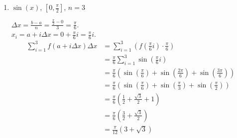 \documentclass[nooutcomes,handout]{ximera}
\begin{document}
\begin{problem}
\begin{enumerate}
	\item  $\sin (x)$, \; $\left[ 0, \frac{\pi}{2} \right]$, \; $n=3$
		\begin{freeResponse}
		$\Delta x=\frac{b-a}{n}=\frac{\frac{\pi }{2}-0}{3}=\frac{\pi }{6}$.  \\
		$x_i=a+i\Delta x=0+\frac{\pi }{6}i=\frac{\pi }{6}i.$
		\begin{align*}
		\sum_{i=1}^{3}  f ( a + i \Delta x ) \Delta x  &= \sum_{i=1}^{3} \left( f \left( \frac{\pi}{6}i \right) \cdot \frac{\pi}{6} \right) \\
		&= \frac{\pi}{6} \sum_{i=1}^{3} \sin \left( \frac{\pi}{6} i \right) \\
		&= \frac{\pi}{6} \left( \sin \left( \frac{\pi}{6} \right) + \sin \left( \frac{2 \pi}{6} \right) + \sin \left( \frac{3 \pi}{6} \right) \right) \\
		&= \frac{\pi}{6} \left( \sin \left( \frac{\pi}{6} \right) + \sin \left( \frac{\pi}{3} \right) + \sin \left( \frac{\pi}{2} \right) \right) \\
		&= \frac{\pi}{6} \left( \frac{1}{2} + \frac{\sqrt{3}}{2} + 1 \right)  \\
		&= \frac{\pi}{6} \left( \frac{3}{2} + \frac{\sqrt{3}}{2} \right)  \\
		&= \frac{\pi}{12} (3 + \sqrt{3} )
		\end{align*}
		\end{freeResponse}
		
		
		
	\end{enumerate}
		
		
		

\end{problem}
	
	
	
	
	
\end{document}
